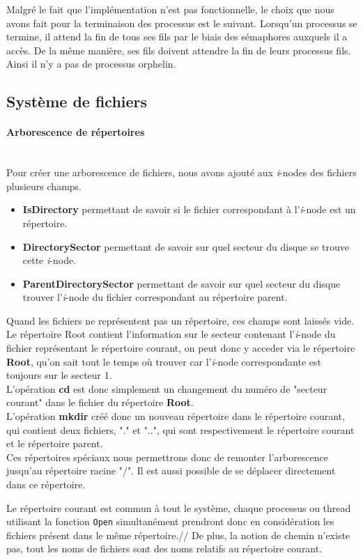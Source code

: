 \documentclass{report}
\newcommand{\myparagraph}[1]{\paragraph*{#1}\mbox{}\\}
\begin{document}
Malgré le fait que l'implémentation n'est pas fonctionnelle, le choix que nous avons fait pour la terminaison des processus est le suivant.
Lorsqu'un processus se termine, il attend la fin de tous ses fils par le biais des sémaphores auxquels il a accès.
De la même manière, ses fils doivent attendre la fin de leurs processus fils. Ainsi il n'y a pas de processus orphelin.

\subsection*{Système de fichiers}
\myparagraph{Arborescence de répertoires}
	
Pour créer une arborescence de fichiers, nous avons ajouté aux \textit{i}-nodes des fichiers plusieurs champs.
\begin{itemize}
\item \textbf{IsDirectory} permettant de savoir si le fichier correspondant à l'\textit{i}-node est un répertoire.
\item \textbf{DirectorySector} permettant de savoir sur quel secteur du disque se trouve cette \textit{i}-node.
\item \textbf{ParentDirectorySector} permettant de savoir sur quel secteur du disque trouver l'\textit{i}-node du fichier correspondant au répertoire parent.
\end{itemize}
Quand les fichiers ne représentent pas un répertoire, ces champs sont laissés vide. \\
Le répertoire Root contient l'information sur le secteur contenant l'\textit{i}-node du fichier représentant le répertoire courant, on peut donc y acceder via le répertoire \textbf{Root}, qu'on sait tout le temps où trouver car l'\textit{i}-node correspondante est toujours sur le secteur 1.	\\	
L'opération \textbf{cd} est donc simplement un changement du numéro de "secteur courant" dans le fichier du répertoire \textbf{Root}.  \\
L'opération \textbf{mkdir} créé donc un nouveau répertoire dans le répertoire courant, qui contient deux fichiers, "." et "..", qui sont respectivement le répertoire courant et le répertoire parent.\\	
	
	Ces répertoires spéciaux nous permettrons donc de remonter l'arborescence jusqu'au répertoire racine "/". Il est aussi possible de se déplacer directement dans ce répertoire.
	
	Le répertoire courant est commun à tout le système, chaque processus ou thread utilisant la fonction \texttt{Open} simultanément prendront donc en considération les fichiers présent dans le même répertoire.//
De plus, la notion de chemin n'existe pas, tout les noms de fichiers sont des noms relatifs au répertoire courant.\\
\end{document}
